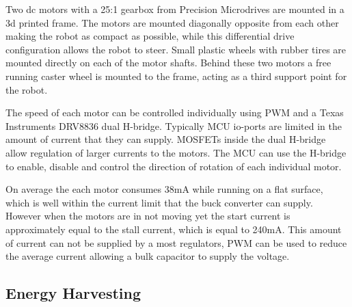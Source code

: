 
Two dc motors with a 25:1 gearbox from Precision Microdrives are mounted in a 3d printed frame. %
The motors are mounted diagonally opposite from each other making the robot as compact as possible, while this differential drive configuration allows the robot to steer.
Small plastic wheels with rubber tires are mounted directly on each of the motor shafts.
Behind these two motors a free running caster wheel is mounted to the frame, acting as a third support point for the robot.

The speed of each motor can be controlled individually using PWM and a Texas Instruments DRV8836 dual H-bridge.
Typically MCU io-ports are limited in the amount of current that they can supply.
MOSFETs inside the dual H-bridge allow regulation of larger currents to the motors.
The MCU can use the H-bridge to enable, disable and control the direction of rotation of each individual motor.

On average the each motor consumes 38mA while running on a flat surface, which is well within the current limit that the buck converter can supply.
However when the motors are in not moving yet the start current is approximately equal to the stall current, which is equal to 240mA.
This amount of current can not be supplied by a most regulators, PWM can be used to reduce the average current allowing a bulk capacitor to supply the voltage.

\subsection{Energy Harvesting}
\label{subsec:energy_harvesting}



